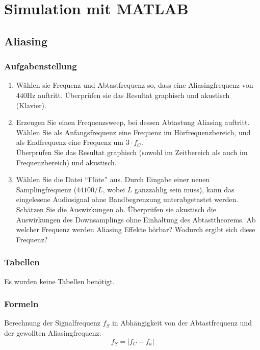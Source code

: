 \section{Simulation mit MATLAB}

%
%
\subsection{Aliasing}
\subsubsection{Aufgabenstellung}
\begin{enumerate}
\item Wählen sie Frequenz und Abtastfrequenz so, dass eine Aliasingfrequenz von $440$Hz auftritt. Überprüfen sie das Resultat graphisch und akustisch (Klavier).
\item Erzeugen Sie einen Frequenzsweep, bei dessen Abtastung Aliasing auftritt. Wählen Sie als Anfangsfrequenz eine Frequenz im Hörfrequenzbereich, und als Endfrequenz eine Frequenz um $3 \cdot f_C$. \\
Überprüfen Sie das Resultat graphisch (sowohl im Zeitbereich als auch im Frequenzbereich) und akustisch. 
\item Wählen Sie die Datei ``Flöte'' aus. Durch Eingabe einer neuen Samplingfrequenz ($44100/L$, wobei $L$ ganzzahlig sein muss), kann das eingelesene Audiosignal ohne Bandbegrenzung unterabgetastet werden. Schätzen Sie die Auswirkungen ab. Überprüfen sie akustisch die Auswirkungen des Downsamplings ohne Einhaltung des Abtasttheorems. Ab welcher Frequenz werden Aliasing Effekte hörbar? Wodurch ergibt sich diese Frequenz?
\end{enumerate}



\subsubsection{Tabellen}
Es wurden keine Tabellen benötigt.

\subsubsection{Formeln}
Berechnung der Signalfrequenz $f_S$ in Abhängigkeit von der Abtastfrequenz und der gewollten Aliasingfrequenz:
\begin{equation}\label{eq:1_1}
 f_S = |f_C - f_a|
\end{equation}

